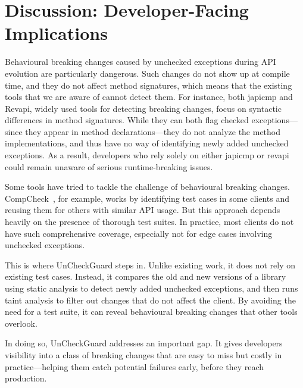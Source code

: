 \section{Discussion: Developer-Facing Implications}

Behavioural breaking changes caused by unchecked exceptions during API evolution are particularly dangerous. Such changes do not show up at compile time, and they do not affect method signatures, which means that the existing tools that we are aware of cannot detect them. For instance, both japicmp and Revapi, widely used tools for detecting breaking changes, focus on syntactic differences in method signatures. While they can both flag checked exceptions—since they appear in method declarations—they do not analyze the method implementations, and thus have no way of identifying newly added unchecked exceptions. As a result, developers who rely solely on either japicmp or revapi could remain unaware of serious runtime-breaking issues.

Some tools have tried to tackle the challenge of behavioural breaking changes. CompCheck~\cite{CompCheck}, for example, works by identifying test cases in some clients and reusing them for others with similar API usage. But this approach depends heavily on the presence of thorough test suites. In practice, most clients do not have such comprehensive coverage, especially not for edge cases involving unchecked exceptions.

This is where UnCheckGuard steps in. Unlike existing work, it does not rely on existing test cases. Instead, it compares the old and new versions of a library using static analysis to detect newly added unchecked exceptions, and then runs taint analysis to filter out changes that do not affect the client. By avoiding the need for a test suite, it can reveal behavioural breaking changes that other tools overlook.

In doing so, UnCheckGuard addresses an important gap. It gives developers visibility into a class of breaking changes that are easy to miss but costly in practice—helping them catch potential failures early, before they reach production.
